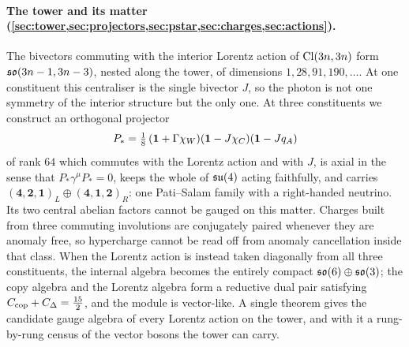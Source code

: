 \paragraph{The tower and its matter (\cref{sec:tower,sec:projectors,sec:pstar,sec:charges,sec:actions}).} The bivectors
commuting with the interior Lorentz action of $\mathrm{Cl}(3n,3n)$ form $\mathfrak{so}(3n-1,3n-3)$, nested along the tower, of dimensions
$1,28,91,190,\dots$. At one constituent this centraliser is the single bivector $J$, so the photon is not one symmetry of the
interior structure but the only one. At three constituents we construct an orthogonal projector
\[
P_*=\tfrac18\,(\mathbf 1+\Gamma\chi_W)(\mathbf 1-J\chi_C)(\mathbf 1-Jq_A)
\]
of rank $64$ which commutes with the Lorentz action and with $J$, is axial in the sense that $P_*\gamma^\mu P_*=0$, keeps the whole of
$\mathfrak{su}(4)$ acting faithfully, and carries $(\mathbf4,\mathbf2,\mathbf1)_L\oplus(\mathbf4,\mathbf1,\mathbf2)_R$: one Pati--Salam
family with a right-handed neutrino. Its two central abelian factors cannot be gauged on this matter. Charges built from
three commuting involutions are conjugately paired whenever they are anomaly free, so hypercharge cannot be read off from
anomaly cancellation inside that class. When the Lorentz action is instead taken diagonally from all three constituents,
the internal algebra becomes the entirely compact $\mathfrak{so}(6)\oplus\mathfrak{so}(3)$; the copy algebra and the Lorentz algebra form a
reductive dual pair satisfying $C_{\rm cop}+C_\Delta=\tfrac{15}2$, and the module is vector-like. A single theorem gives
the candidate gauge algebra of every Lorentz action on the tower, and with it a rung-by-rung census of the vector bosons
the tower can carry.


